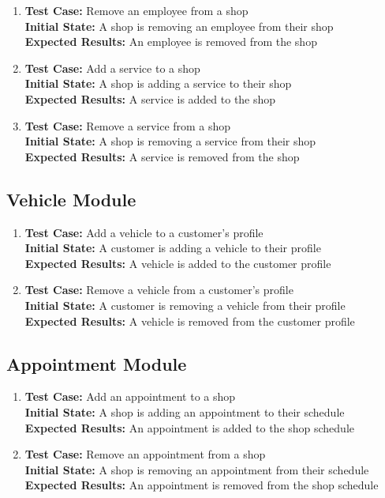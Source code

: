 \documentclass[12pt, titlepage]{article}
\begin{document}
\begin{enumerate}
    \item \textbf{Test Case:} Remove an employee from a shop \\
    \textbf{Initial State:} A shop is removing an employee from their shop \\
    \textbf{Expected Results:} An employee is removed from the shop
    
    \item \textbf{Test Case:} Add a service to a shop \\
    \textbf{Initial State:} A shop is adding a service to their shop \\
    \textbf{Expected Results:} A service is added to the shop
    
    \item \textbf{Test Case:} Remove a service from a shop \\
    \textbf{Initial State:} A shop is removing a service from their shop \\
    \textbf{Expected Results:} A service is removed from the shop
\end{enumerate}

\subsection{Vehicle Module}
\begin{enumerate}
    \item \textbf{Test Case:} Add a vehicle to a customer's profile \\
    \textbf{Initial State:} A customer is adding a vehicle to their profile \\
    \textbf{Expected Results:} A vehicle is added to the customer profile
    
    \item \textbf{Test Case:} Remove a vehicle from a customer's profile \\
    \textbf{Initial State:} A customer is removing a vehicle from their profile \\
    \textbf{Expected Results:} A vehicle is removed from the customer profile
\end{enumerate}

\subsection{Appointment Module}
\begin{enumerate}
    \item \textbf{Test Case:} Add an appointment to a shop \\
    \textbf{Initial State:} A shop is adding an appointment to their schedule \\
    \textbf{Expected Results:} An appointment is added to the shop schedule
    
    \item \textbf{Test Case:} Remove an appointment from a shop \\
    \textbf{Initial State:} A shop is removing an appointment from their schedule \\
    \textbf{Expected Results:} An appointment is removed from the shop schedule
\end{enumerate}
\end{document}
